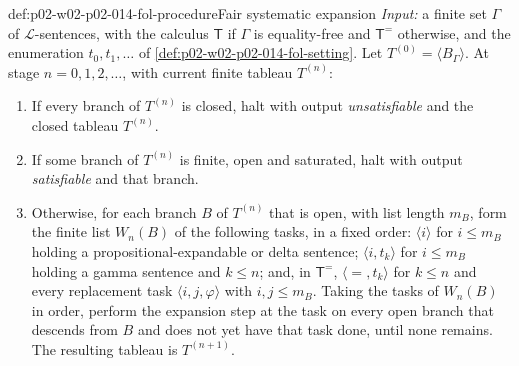 \begin{hbmethod}{def:p02-w02-p02-014-fol-procedure}{Fair systematic expansion}
\emph{Input:} a finite set \(\Gamma\) of \(\mathcal L\)-sentences, with the
calculus \(\mathsf T\) if \(\Gamma\) is equality-free and \(\mathsf T^{=}\)
otherwise, and the enumeration \(t_0,t_1,\ldots\) of
\cref{def:p02-w02-p02-014-fol-setting}.  Let \(T^{(0)}=\langle
B_\Gamma\rangle\).  At stage \(n=0,1,2,\ldots\), with current finite tableau
\(T^{(n)}\):
\begin{enumerate}
  \item If every branch of \(T^{(n)}\) is closed, halt with output
        \emph{unsatisfiable} and the closed tableau \(T^{(n)}\).
  \item If some branch of \(T^{(n)}\) is finite, open and saturated, halt
        with output \emph{satisfiable} and that branch.
  \item Otherwise, for each branch \(B\) of \(T^{(n)}\) that is open, with
        list length \(m_B\), form the finite list \(W_n(B)\) of the
        following tasks, in a fixed order: \(\langle i\rangle\) for
        \(i\leq m_B\) holding a propositional-expandable or delta sentence;
        \(\langle i,t_k\rangle\) for \(i\leq m_B\) holding a gamma sentence
        and \(k\leq n\); and, in \(\mathsf T^{=}\), \(\langle{=},t_k\rangle\)
        for \(k\leq n\) and every replacement task \(\langle
        i,j,\varphi\rangle\) with \(i,j\leq m_B\).  Taking the tasks of
        \(W_n(B)\) in order, perform the expansion step at the task on every
        open branch that descends from \(B\) and does not yet have that task
        done, until none remains.  The resulting tableau is
        \(T^{(n+1)}\).
\end{enumerate}
\end{hbmethod}

